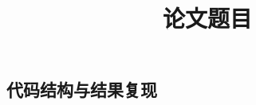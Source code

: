 \documentclass[withoutpreface,bwprint]{cumcmthesis}
\title{论文题目}
\begin{document}
\maketitle

\begin{abstract}

\end{abstract}











\clearpage
\begingroup
\small

\endgroup

\clearpage
\begin{appendices}
\section{代码结构与结果复现}

\end{appendices}
\end{document}
